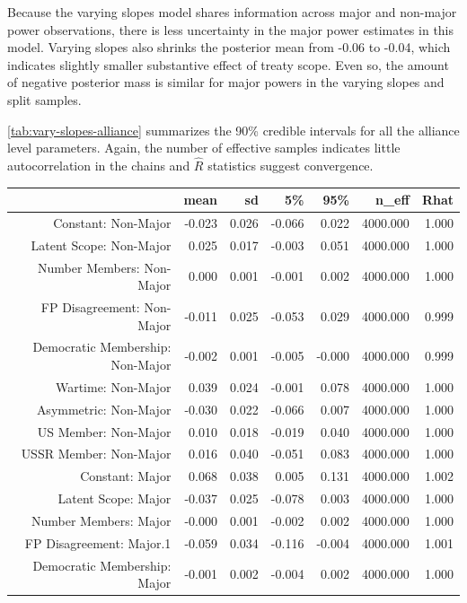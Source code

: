 \documentclass[12pt]{article}
\begin{document}
Because the varying slopes model shares information across major and non-major power observations, there is less uncertainty in the major power estimates in this model. 
Varying slopes also shrinks the posterior mean from -0.06 to -0.04, which indicates slightly smaller substantive effect of treaty scope. 
Even so, the amount of negative posterior mass is similar for major powers in the varying slopes and split samples. 


\autoref{tab:vary-slopes-alliance} summarizes the 90\% credible intervals for all the alliance level parameters. 
Again, the number of effective samples indicates little autocorrelation in the chains and $\hat{R}$ statistics suggest convergence. 


\begin{table}[ht]
\centering
\begin{tabular}{rrrrrrr}
  \hline
 & mean & sd & 5\% & 95\% & n\_eff & Rhat \\ 
  \hline
  Constant: Non-Major & -0.023 & 0.026 & -0.066 & 0.022 & 4000.000 & 1.000 \\ 
  Latent Scope: Non-Major & 0.025 & 0.017 & -0.003 & 0.051 & 4000.000 & 1.000 \\ 
  Number Members: Non-Major & 0.000 & 0.001 & -0.001 & 0.002 & 4000.000 & 1.000 \\ 
  FP Disagreement: Non-Major & -0.011 & 0.025 & -0.053 & 0.029 & 4000.000 & 0.999 \\ 
  Democratic Membership: Non-Major & -0.002 & 0.001 & -0.005 & -0.000 & 4000.000 & 0.999 \\ 
  Wartime: Non-Major & 0.039 & 0.024 & -0.001 & 0.078 & 4000.000 & 1.000 \\ 
  Asymmetric: Non-Major & -0.030 & 0.022 & -0.066 & 0.007 & 4000.000 & 1.000 \\ 
  US Member: Non-Major & 0.010 & 0.018 & -0.019 & 0.040 & 4000.000 & 1.000 \\ 
  USSR Member: Non-Major & 0.016 & 0.040 & -0.051 & 0.083 & 4000.000 & 1.000 \\ 
  Constant: Major & 0.068 & 0.038 & 0.005 & 0.131 & 4000.000 & 1.002 \\ 
  Latent Scope: Major & -0.037 & 0.025 & -0.078 & 0.003 & 4000.000 & 1.000 \\ 
  Number Members: Major & -0.000 & 0.001 & -0.002 & 0.002 & 4000.000 & 1.000 \\ 
  FP Disagreement: Major.1 & -0.059 & 0.034 & -0.116 & -0.004 & 4000.000 & 1.001 \\ 
  Democratic Membership: Major & -0.001 & 0.002 & -0.004 & 0.002 & 4000.000 & 1.000 \\ 

\end{tabular}
\end{table}
\end{document}

